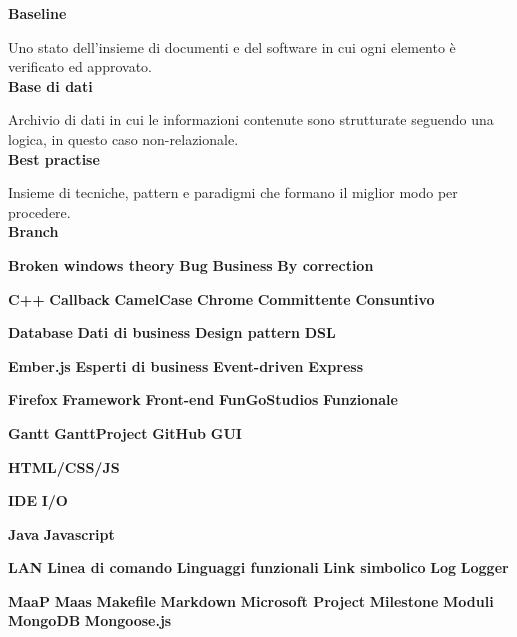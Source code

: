 \textbf{Baseline}

Uno stato dell'insieme di documenti e del software in cui ogni elemento è verificato ed approvato. \\

\textbf{Base di dati}

Archivio di dati in cui le informazioni contenute sono strutturate seguendo una logica, in questo caso non-relazionale. \\ 

\textbf{Best practise}

Insieme di tecniche, pattern e paradigmi che formano il miglior modo per procedere. \\

\textbf{Branch}



\textbf{Broken windows theory}
\textbf{Bug}
\textbf{Business}
\textbf{By correction}


\textbf{C++}
\textbf{Callback}
\textbf{CamelCase}
\textbf{Chrome}
\textbf{Committente}
\textbf{Consuntivo}


\textbf{Database}
\textbf{Dati di business}
\textbf{Design pattern}
\textbf{DSL}


\textbf{Ember.js}
\textbf{Esperti di business}
\textbf{Event-driven}
\textbf{Express}


\textbf{Firefox}
\textbf{Framework}
\textbf{Front-end}
\textbf{FunGoStudios}
\textbf{Funzionale}


\textbf{Gantt}
\textbf{GanttProject}
\textbf{GitHub}
\textbf{GUI}


\textbf{HTML/CSS/JS}


\textbf{IDE}
\textbf{I/O}


\textbf{Java}
\textbf{Javascript}


\textbf{LAN}
\textbf{Linea di comando}
\textbf{Linguaggi funzionali}
\textbf{Link simbolico}
\textbf{Log}
\textbf{Logger}


\textbf{MaaP}
\textbf{Maas}
\textbf{Makefile}
\textbf{Markdown}
\textbf{Microsoft Project}
\textbf{Milestone}
\textbf{Moduli}
\textbf{MongoDB}
\textbf{Mongoose.js}

